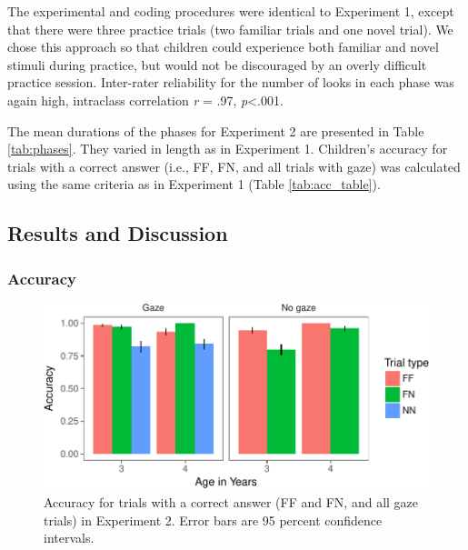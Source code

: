 \documentclass[a4paper,man,apacite,floatsintext]{apa6}
\newenvironment{CodeChunk}{}{}
\begin{document}
The experimental and coding procedures were identical to Experiment 1,
except that there were three practice trials (two familiar trials and
one novel trial). We chose this approach so that children could
experience both familiar and novel stimuli during practice, but would
not be discouraged by an overly difficult practice session. Inter-rater
reliability for the number of looks in each phase was again high,
intraclass correlation \emph{r} = .97, \emph{p}\textless{}.001.

The mean durations of the phases for Experiment 2 are presented in Table
\ref{tab:phases}. They varied in length as in Experiment 1. Children's
accuracy for trials with a correct answer (i.e., FF, FN, and all trials
with gaze) was calculated using the same criteria as in Experiment 1
(Table \ref {tab:acc_table}).

\subsection{Results and Discussion}\label{results-and-discussion-1}

\subsubsection{Accuracy}\label{accuracy-1}

\begin{CodeChunk}
\begin{figure}[b]

{\centering \includegraphics{figs/acc_e2-1} 

}

\caption[Accuracy for trials with a correct answer (FF and FN, and all gaze trials) in Experiment 2]{Accuracy for trials with a correct answer (FF and FN, and all gaze trials) in Experiment 2. Error bars are 95 percent confidence intervals.}\label{fig:acc_e2}
\end{figure}
\end{CodeChunk}
\end{document}
